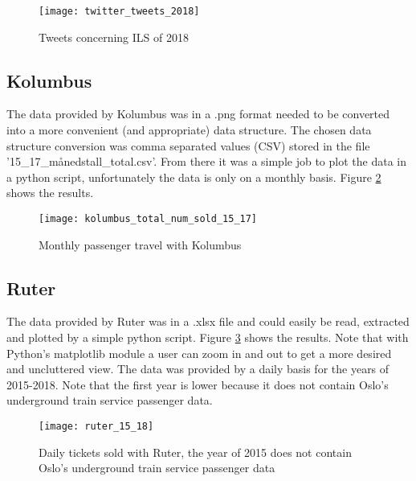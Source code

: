 \begin{figure}[ht]
\texttt{[image: twitter\_tweets\_2018]}
\centering
\caption{Tweets concerning ILS of 2018}
\label{fig:twitterAnal}
\end{figure}








\subsection{Kolumbus}
The data provided by Kolumbus was in a .png format needed to be converted into a more convenient (and appropriate) data structure. The chosen data structure conversion was comma separated values (CSV) stored in the file '15\_17\_månedstall\_total.csv'. From there it was a simple job to plot the data in a python script, unfortunately the data is only on a monthly basis. Figure \ref{fig:kolumbus_15_17} shows the results.

\begin{figure}[ht]
\texttt{[image: kolumbus\_total\_num\_sold\_15\_17]}
\centering
\caption{Monthly passenger travel with Kolumbus}
\label{fig:kolumbus_15_17}
\end{figure}









\subsection{Ruter}
The data provided by Ruter was in a .xlsx file and could easily be read, extracted and plotted by a simple python script. Figure \ref{fig:ruter_15_18} shows the results. Note that with Python's matplotlib module a user can zoom in and out to get a more desired and uncluttered view. The data was provided by a daily basis for the years of 2015-2018. Note that the first year is lower because it does not contain Oslo's underground train service passenger data.

\begin{figure}[ht]
\texttt{[image: ruter\_15\_18]}
\centering
\caption{Daily tickets sold with Ruter, the year of 2015 does not contain Oslo's underground train service passenger data}
\label{fig:ruter_15_18}
\end{figure}











